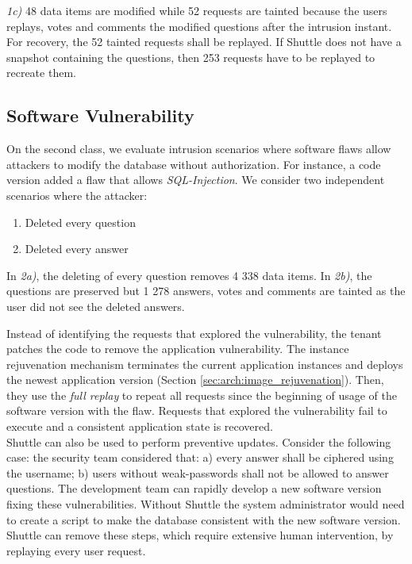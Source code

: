 \textit{1c)} 48 data items are modified while 52 requests are tainted because the users replays, votes and comments the modified questions after the intrusion instant. For recovery, the 52 tainted requests shall be replayed. If Shuttle does not have a snapshot containing the questions, then 253 requests have to be replayed to recreate them. 



\subsection{Software Vulnerability}\label{sec:eval:accuracy:software}
On the second class, we evaluate intrusion scenarios where software flaws allow attackers to modify the database without authorization. For instance, a code version added a flaw that allows \emph{SQL-Injection}. We consider two independent scenarios where the attacker:

\begin{enumerate}[label=\alph*]
  \item Deleted every question
  \item Deleted every answer
\end{enumerate}


In \textit{2a)}, the deleting of every question removes 4 338 data items. In \textit{2b)}, the questions are preserved but 1 278 answers, votes and comments are tainted as the user did not see the deleted answers.



Instead of identifying the requests that explored the vulnerability, the tenant patches the code to remove the application vulnerability. The instance rejuvenation mechanism terminates the current application instances and deploys the newest application version (Section \ref{sec:arch:image_rejuvenation}). Then, they use the \textit{full replay} to repeat all requests since the beginning of usage of the software version with the flaw. Requests that explored the vulnerability fail to execute and a consistent application state is recovered.\\

Shuttle can also be used to perform preventive updates. Consider the following case: the security team considered that: a) every answer shall be ciphered using the username; b) users without weak-passwords shall not be allowed to answer questions. The development team can rapidly develop a new software version fixing these vulnerabilities. Without Shuttle the system administrator would need to create a script to make the database consistent with the new software version. Shuttle can remove these steps, which require extensive human intervention, by replaying every user request.

